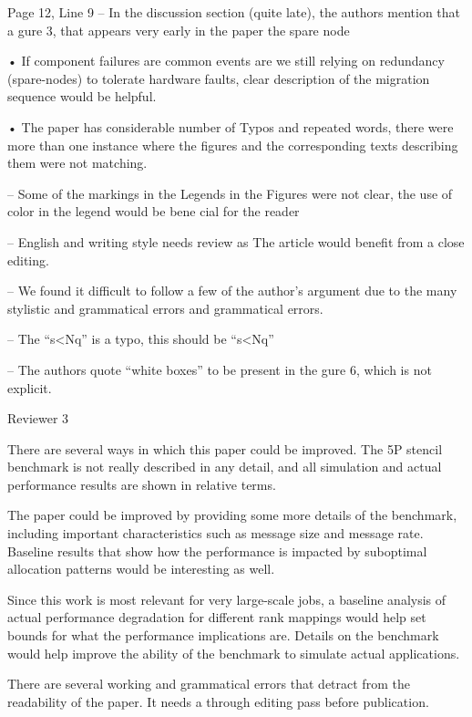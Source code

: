 \documentclass[]{letter}
\begin{document}
\begin{description}
Page 12, Line 9
– In the discussion section (quite late), the authors mention that a
gure 3, that appears very early in the paper the spare node %

• If component failures are common events are we still relying on
redundancy (spare-nodes) to tolerate hardware faults, clear
description of the migration sequence would be helpful. 

• The paper has considerable number of Typos and repeated words, there
were more than one instance where  the figures and the corresponding
texts describing them were not matching. 

– Some of the markings in the Legends in the Figures were not clear,
the use of color in the legend would be  bene cial for the reader

– English and writing style needs review as The article would benefit
from a close editing. 

– We found it difficult to follow a few of the author’s argument due to
the many stylistic and grammatical errors and grammatical errors. 

– The ``s<Nq'' is a typo, this should be ``s<Nq''

– The authors quote “white boxes” to be present in the  gure 6, which
is not explicit.


\item{Reviewer 3}

There are several ways in which this paper could be
improved. The 5P stencil benchmark is not really described in any
detail, and all simulation and actual performance results are shown in
relative terms. 

The paper could be improved by providing some more
details of the benchmark, including important characteristics such as
message size and message rate. Baseline results that show how the
performance is impacted by suboptimal allocation patterns would be
interesting as well. 

Since this work is most relevant for very
large-scale jobs, a baseline analysis of actual performance
degradation for different rank mappings would help set bounds for what
the performance implications are. Details on the benchmark would help
improve the ability of the benchmark to simulate actual
applications. 

There are several working and grammatical errors that
detract from the readability of the paper. It needs a through editing
pass before publication. 

\end{description}
\end{document}
